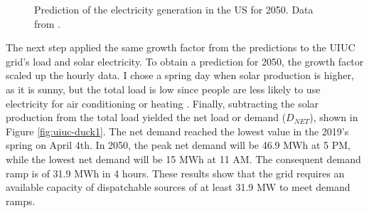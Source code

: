\begin{figure}[htbp!]
    \centering
    \hfill
    \caption{Prediction of the electricity generation in the US for 2050. Data from \cite{us_energy_information_administration_electric_2020}.}
    \label{fig:prediction}
\end{figure}

The next step applied the same growth factor from the predictions to the \gls{UIUC} grid's load and solar electricity.
To obtain a prediction for 2050, the growth factor scaled up the hourly data.
I chose a spring day when solar production is higher, as it is sunny, but the total load is low since people are less likely to use electricity for air conditioning or heating \cite{us_department_of_energy_confronting_2017}.
Finally, subtracting the solar production from the total load yielded the net load or demand ($D_{NET}$), shown in Figure \ref{fig:uiuc-duck1}.
The net demand reached the lowest value in the 2019's spring on April 4th.
In 2050, the peak net demand will be 46.9 MWh at 5 PM, while the lowest net demand will be 15 MWh at 11 AM.
The consequent demand ramp is of 31.9 MWh in 4 hours.
These results show that the grid requires an available capacity of dispatchable sources of at least 31.9 MW to meet demand ramps.

